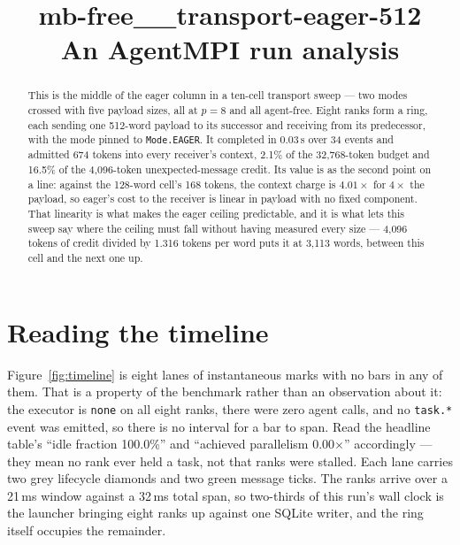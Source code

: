 \documentclass[11pt]{article}
\title{\textbf{mb-free\_\_transport-eager-512}\\[2pt]\large An AgentMPI run analysis}
\author{}
\date{}
\begin{document}
\maketitle

\begin{abstract}
This is the middle of the eager column in a ten-cell transport sweep --- two modes
crossed with five payload sizes, all at $p = 8$ and all agent-free. Eight ranks form
a ring, each sending one 512-word payload to its successor and receiving from its
predecessor, with the mode pinned to \texttt{Mode.EAGER}. It completed in 0.03\,s
over 34 events and admitted 674 tokens into every receiver's context, 2.1\% of the
32{,}768-token budget and 16.5\% of the 4{,}096-token unexpected-message credit. Its
value is as the second point on a line: against the 128-word cell's 168 tokens, the
context charge is $4.01\times$ for $4\times$ the payload, so eager's cost to the
receiver is linear in payload with no fixed component. That linearity is what makes
the eager ceiling predictable, and it is what lets this sweep say where the ceiling
must fall without having measured every size --- 4{,}096 tokens of credit divided by
1.316 tokens per word puts it at 3{,}113 words, between this cell and the next
one up.
\end{abstract}



\section{Reading the timeline}

Figure~\ref{fig:timeline} is eight lanes of instantaneous marks with no bars in any
of them. That is a property of the benchmark rather than an observation about it: the
executor is \texttt{none} on all eight ranks, there were zero agent calls, and no
\texttt{task.*} event was emitted, so there is no interval for a bar to span. Read
the headline table's ``idle fraction 100.0\%'' and ``achieved parallelism
0.00$\times$'' accordingly --- they mean no rank ever held a task, not that ranks
were stalled. Each lane carries two grey lifecycle diamonds and two green message
ticks. The ranks arrive over a 21\,ms window against a 32\,ms total span, so
two-thirds of this run's wall clock is the launcher bringing eight ranks up against
one SQLite writer, and the ring itself occupies the remainder.
\end{document}
